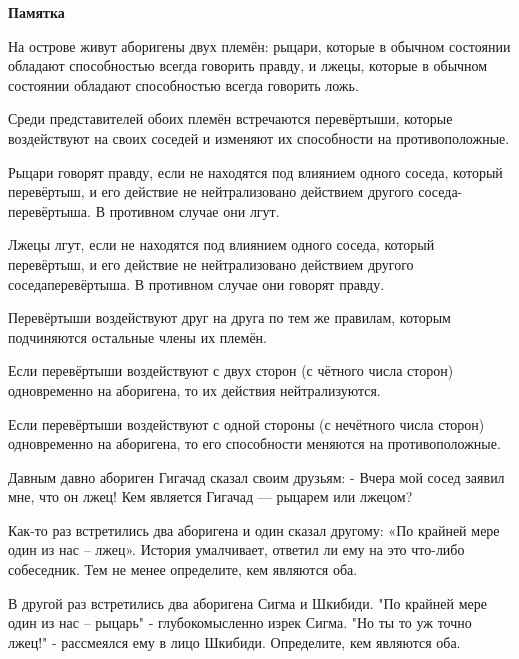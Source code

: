 \hspace{3mm}

\centerline{\bf \Huge Памятка}

 На острове живут аборигены двух племён: рыцари, которые в обычном состоянии обладают способностью всегда говорить правду, и лжецы, которые в обычном состоянии обладают способностью всегда говорить ложь.

 Среди представителей обоих племён встречаются перевёртыши, которые воздействуют на своих соседей и изменяют их способности на противоположные.

 Рыцари говорят правду, если не находятся под влиянием одного соседа, который перевёртыш, и его действие не нейтрализовано действием другого соседа-перевёртыша. В противном случае они лгут.

 Лжецы лгут, если не находятся под влиянием одного соседа, который перевёртыш, и его действие не нейтрализовано действием другого соседаперевёртыша. В противном случае они говорят правду.

 Перевёртыши воздействуют друг на друга по тем же правилам, которым подчиняются остальные члены их племён.

 Если перевёртыши воздействуют с двух сторон (с чётного числа сторон) одновременно на аборигена, то их действия нейтрализуются.

 Если перевёртыши воздействуют с одной стороны (с нечётного числа сторон) одновременно на аборигена, то его способности меняются на противоположные.

 Давным давно абориген Гигачад сказал своим друзьям: - Вчера мой сосед заявил мне, что он лжец! Кем является Гигачад — рыцарем или лжецом?

Как-то раз встретились два аборигена и один сказал другому: «По крайней мере один из нас – лжец». История умалчивает, ответил ли ему на это что-либо собеседник. Тем не менее определите, кем являются оба.

В другой раз встретились два аборигена Сигма и Шкибиди. "По крайней мере один из нас – рыцарь" - глубокомысленно изрек Сигма. "Но ты то уж точно лжец!" - рассмеялся ему в лицо Шкибиди. Определите, кем являются оба.

